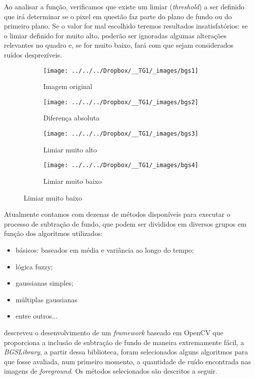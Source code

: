 \documentclass[ecp,tc]{iiufrgs}
\begin{document}
Ao analisar a função, verificamos que existe um limiar (\textit{threshold}) a ser definido  que irá determinar se o pixel em questão faz parte do plano de fundo ou do primeiro plano. Se o valor for mal escolhido teremos resultados insatisfatórios: se o limiar definido for muito alto, poderão ser ignoradas algumas alterações relevantes no quadro e, se for muito baixo, fará com que sejam considerados ruídos desprezíveis.

\begin{figure}
	\centering
	\caption{Definição do \textit{threshold} para \textit{background subtraction}}
	\begin{subfigure}[b]{0.4\textwidth}
		\texttt{[image: ../../../Dropbox/\_\_TG1/\_images/bgs1]}
		\caption{Imagem original}
		\label{fig:bgs1}
	\end{subfigure}
	\quad
	\begin{subfigure}[b]{0.4\textwidth}
		\texttt{[image: ../../../Dropbox/\_\_TG1/\_images/bgs2]}
		\caption{Diferença absoluta}
		\label{fig:bgs2}
	\end{subfigure}
	\hfill
	\begin{subfigure}[b]{0.4\textwidth}
		\texttt{[image: ../../../Dropbox/\_\_TG1/\_images/bgs3]}
		\caption{Limiar muito alto}
		\label{fig:bgs3}
	\end{subfigure}
	\quad
	\begin{subfigure}[b]{0.4\textwidth}
		\texttt{[image: ../../../Dropbox/\_\_TG1/\_images/bgs4]}
		\caption{Limiar muito baixo}
		\label{fig:bgs4}
	\end{subfigure}
	\label{fig:imagebgs}
\end{figure}

Atualmente contamos com dezenas de métodos disponíveis para executar o processo de subtração de fundo, que podem ser divididos em diversos grupos em função dos algoritmos utilizados:
\begin{itemize}
\item básicos: baseados em média e variância ao longo do tempo;
\item lógica fuzzy;
\item gaussianas simples;
\item múltiplas gaussianas
\item entre outros...
\end{itemize}


 descreveu o desenvolvimento de um \textit{framework} baseado em OpenCV que proporciona a inclusão de subtração de fundo de maneira extremamente fácil, a \textit{BGSLibrary}, a partir dessa biblioteca, foram selecionados alguns algoritmos para que fosse avaliada, num primeiro momento, a quantidade de ruído encontrada nas imagens de \textit{foreground}. Os métodos selecionados são descritos a seguir.
\end{document}
